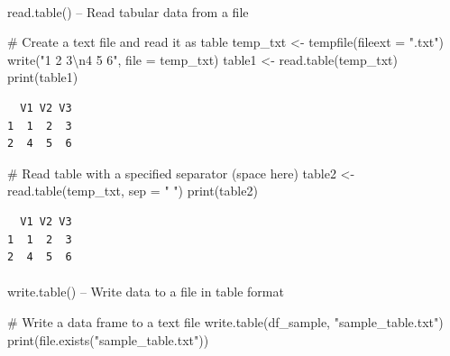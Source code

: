 \documentclass[
  letterpaper,
  DIV=11,
  numbers=noendperiod]{scrartcl}
\makeatletter
\let\oldparagraph\paragraph
\renewcommand{\paragraph}{
    \@ifstar
      \xxxParagraphStar
      \xxxParagraphNoStar
  }
\newcommand{\xxxParagraphStar}[1]{\oldparagraph*{#1}\mbox{}}
\newcommand{\xxxParagraphNoStar}[1]{\oldparagraph{#1}\mbox{}}
\newenvironment{Shaded}{\begin{snugshade}}{\end{snugshade}}
\newcommand{\AttributeTok}[1]{\textcolor[rgb]{0.40,0.45,0.13}{#1}}
\newcommand{\CommentTok}[1]{\textcolor[rgb]{0.37,0.37,0.37}{#1}}
\newcommand{\FunctionTok}[1]{\textcolor[rgb]{0.28,0.35,0.67}{#1}}
\newcommand{\NormalTok}[1]{\textcolor[rgb]{0.00,0.23,0.31}{#1}}
\newcommand{\OtherTok}[1]{\textcolor[rgb]{0.00,0.23,0.31}{#1}}
\newcommand{\SpecialCharTok}[1]{\textcolor[rgb]{0.37,0.37,0.37}{#1}}
\newcommand{\StringTok}[1]{\textcolor[rgb]{0.13,0.47,0.30}{#1}}
\makeatother
\begin{document}
\paragraph{read.table() -- Read tabular data from a
file}\label{read.table-read-tabular-data-from-a-file}

\begin{Shaded}
\begin{Highlighting}[]
\CommentTok{\#   Create a text file and read it as table}
\NormalTok{temp\_txt }\OtherTok{\textless{}{-}} \FunctionTok{tempfile}\NormalTok{(}\AttributeTok{fileext =} \StringTok{".txt"}\NormalTok{)}
\FunctionTok{write}\NormalTok{(}\StringTok{"1 2 3}\SpecialCharTok{\textbackslash{}n}\StringTok{4 5 6"}\NormalTok{, }\AttributeTok{file =}\NormalTok{ temp\_txt)}
\NormalTok{table1 }\OtherTok{\textless{}{-}} \FunctionTok{read.table}\NormalTok{(temp\_txt)}
\FunctionTok{print}\NormalTok{(table1)}
\end{Highlighting}
\end{Shaded}

\begin{verbatim}
  V1 V2 V3
1  1  2  3
2  4  5  6
\end{verbatim}

\begin{Shaded}
\begin{Highlighting}[]
\CommentTok{\#   Read table with a specified separator (space here)}
\NormalTok{table2 }\OtherTok{\textless{}{-}} \FunctionTok{read.table}\NormalTok{(temp\_txt, }\AttributeTok{sep =} \StringTok{" "}\NormalTok{)}
\FunctionTok{print}\NormalTok{(table2)}
\end{Highlighting}
\end{Shaded}

\begin{verbatim}
  V1 V2 V3
1  1  2  3
2  4  5  6
\end{verbatim}

\paragraph{write.table() -- Write data to a file in table
format}\label{write.table-write-data-to-a-file-in-table-format}

\begin{Shaded}
\begin{Highlighting}[]
\CommentTok{\#   Write a data frame to a text file}
\FunctionTok{write.table}\NormalTok{(df\_sample, }\StringTok{"sample\_table.txt"}\NormalTok{)}
\FunctionTok{print}\NormalTok{(}\FunctionTok{file.exists}\NormalTok{(}\StringTok{"sample\_table.txt"}\NormalTok{))}
\end{Highlighting}
\end{Shaded}
\end{document}
